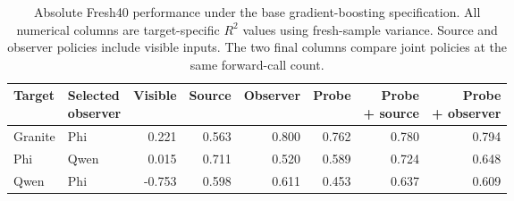 \begin{table}[tbp]
\centering\small\renewcommand{\arraystretch}{1.15}\setlength{\tabcolsep}{3pt}
\caption{Absolute Fresh40 performance under the base gradient-boosting specification. All numerical columns are target-specific \(R^2\) values using fresh-sample variance. Source and observer policies include visible inputs. The two final columns compare joint policies at the same forward-call count.}\label{tab:fresh_by_target}
\begin{tabular*}{\linewidth}{@{\extracolsep{\fill}}llrrrrrr@{}}
\toprule
Target & \shortstack{Selected\\observer} & Visible & Source & Observer & Probe & \shortstack{Probe\\+ source} & \shortstack{Probe\\+ observer} \\ \midrule
Granite & Phi & 0.221 & 0.563 & 0.800 & 0.762 & 0.780 & 0.794 \\
Phi & Qwen & 0.015 & 0.711 & 0.520 & 0.589 & 0.724 & 0.648 \\
Qwen & Phi & -0.753 & 0.598 & 0.611 & 0.453 & 0.637 & 0.609 \\
\bottomrule\end{tabular*}
\end{table}
